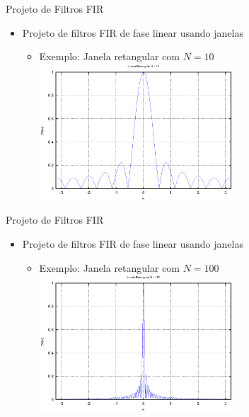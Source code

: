 \begin{slide}{Projeto de Filtros FIR}
\begin{itemize}
   \item  Projeto de filtros FIR de fase linear usando janelas 
   \begin{itemize}
      \item Exemplo: Janela retangular com $N=10$
      \includegraphics[width=0.6\textwidth]{figs/w_ret_10.eps}
   \end{itemize}
\end{itemize}
\end{slide}

\begin{slide}{Projeto de Filtros FIR}
\begin{itemize}
   \item  Projeto de filtros FIR de fase linear usando janelas 
   \begin{itemize}
      \item Exemplo: Janela retangular com $N=100$
      \includegraphics[width=0.6\textwidth]{figs/w_ret_100.eps}
   \end{itemize}
\end{itemize}
\end{slide}

